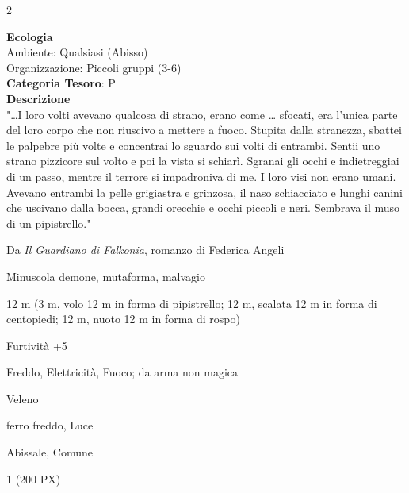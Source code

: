 \begin{multicols}{2}
{\textbf{Ecologia}\\
Ambiente: Qualsiasi (Abisso)\\
Organizzazione: Piccoli gruppi (3-6)\\
\textbf{Categoria Tesoro}: P\\
\textbf{Descrizione}\\
"…I loro volti avevano qualcosa di strano, erano come … sfocati, era l'unica parte del loro corpo che non riuscivo a mettere a fuoco. Stupita dalla stranezza, sbattei le palpebre più volte e concentrai lo sguardo sui volti di entrambi. Sentii uno strano pizzicore sul volto e poi la vista si schiarì.
Sgranai gli occhi e indietreggiai di un passo, mentre il terrore si impadroniva di me. I loro visi non erano umani. Avevano entrambi la pelle grigiastra e grinzosa, il naso schiacciato e lunghi canini che uscivano dalla bocca, grandi orecchie e occhi piccoli e neri. Sembrava il muso di un pipistrello."

Da \emph{Il Guardiano di Falkonia}, romanzo di Federica Angeli

\begin{description}[noitemsep, topsep=0pt, parsep=0pt, partopsep=0pt, itemsep=1pt, leftmargin=2.35cm,  labelwidth=2.2cm, itemindent=0cm, listparindent=0pt] %
\setlength{\baselineskip}{10pt}
\item[\textbf{Taglia/Tipo}] Minuscola demone, mutaforma, malvagio
\item[\textbf{Caratt.}] 
\item[\textbf{Punti Ferita}] 
\item[\textbf{Movimento}] 12 m (3 m, volo 12 m in forma di pipistrello; 12 m, scalata 12 m in forma di centopiedi; 12 m, nuoto 12 m in forma di rospo)
\item[\textbf{Tiri Salvez.}] 
\item[\textbf{Comp.}] Furtività +5
\item[\textbf{Res. Danni}] Freddo, Elettricità, Fuoco; da arma non magica
\item[\textbf{Imm. Danni}] Veleno
\item[\textbf{Vulnerabilità}] ferro freddo, Luce
\item[\textbf{Sensi}] 
\item[\textbf{Linguaggi}] Abissale, Comune
\item[\textbf{Sfida}] 1 (200 PX)
\end{description}
\smallskip

}
\end{multicols}
